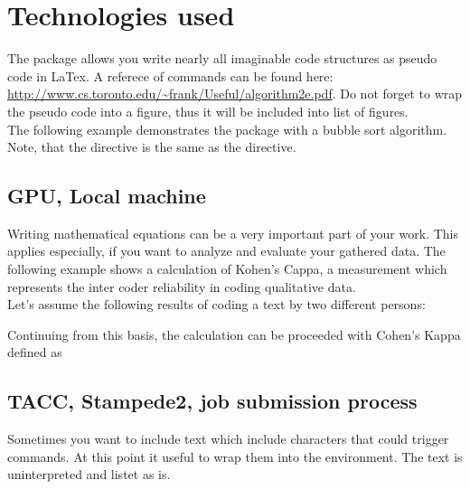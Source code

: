 \section{Technologies used}


The package  allows you write nearly all imaginable code structures as pseudo code in LaTex. A referece of commands can be found here: \url{http://www.cs.toronto.edu/~frank/Useful/algorithm2e.pdf}. Do not forget to wrap the pseudo code into a figure, thus it will be included into list of figures.\\

The following example demonstrates the package with a bubble sort algorithm. Note, that the directive  is the same as the  directive.


\newpage
\subsection{GPU, Local machine}

Writing mathematical equations can be a very important part of your work. This applies especially, if you want to analyze and evaluate your gathered data. The following example shows a calculation of Kohen's Cappa, a measurement which represents the inter coder reliability in coding qualitative data.\\

Let's assume the following results of coding a text by two different persons:


Continuing from this basis, the calculation can be proceeded with Cohen's Kappa defined as


\subsection{TACC, Stampede2, job submission process}

Sometimes you want to include text which include characters that could trigger commands. At this point it useful to wrap them into the  environment. The text is uninterpreted and listet as is.
